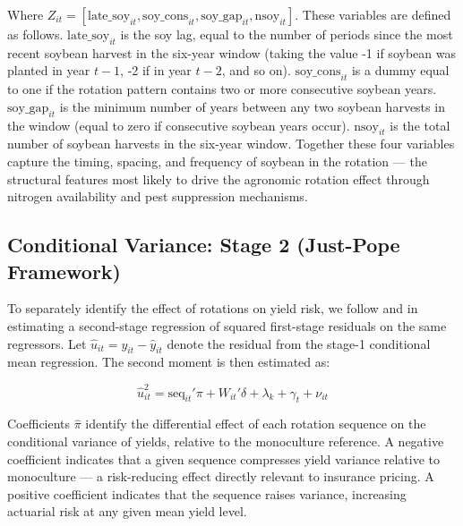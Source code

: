 \documentclass[11pt,letterpaper]{article}
\theoremstyle{remark}
\theoremstyle{plain}
\theoremstyle{definition}
\begin{document}
Where $Z_{it}=\left[\text{late\_soy}_{it}, \text{soy\_cons}_{it}, \text{soy\_gap}_{it},\text{nsoy}_{it}\right]$. These variables are defined as follows. $\text{late\_soy}_{it}$ is the soy lag, equal to the number of periods since the most recent soybean harvest
in the six-year window (taking the value -1 if soybean was planted in year $t-1$, -2 if in year $t-2$, and so on).  $\text{soy\_cons}_{it}$ is a dummy equal to one if the rotation pattern contains two or more consecutive soybean years. $\text{soy\_gap}_{it}$ is the minimum number of years between any two soybean harvests in the window (equal to zero if consecutive soybean years occur). $\text{nsoy}_{it}$ is the total number of soybean harvests in the six-year window. Together these four variables capture the timing, spacing, and frequency of soybean in the rotation — the structural features most likely to drive the agronomic rotation effect through nitrogen availability and pest suppression mechanisms.

\subsection{\label{subsec:stage_2}Conditional Variance: Stage 2 (Just-Pope Framework)}

To separately identify the effect of rotations on yield risk, we follow \cite{Just1979} and \cite{antle1983} in estimating a second-stage regression of squared first-stage residuals on the same regressors. Let $\hat{u}_{it} = y_{it} - \hat{y}_{it}$ denote
the residual from the stage-1 conditional mean regression. The second moment is then estimated as:

\begin{equation}
    \hat{u}_{it}^2 = \text{seq}_{it}'\pi + W_{it}'\delta + \lambda_k + \gamma_t + \nu_{it}
\end{equation}

Coefficients $\hat{\pi}$ identify the differential effect of each rotation sequence on the conditional variance of yields, relative to the monoculture reference. A negative coefficient indicates that a given sequence compresses yield variance relative to monoculture — a risk-reducing effect directly relevant to insurance pricing. A positive coefficient indicates that the sequence raises variance, increasing actuarial risk at any given mean yield level.
\end{document}

